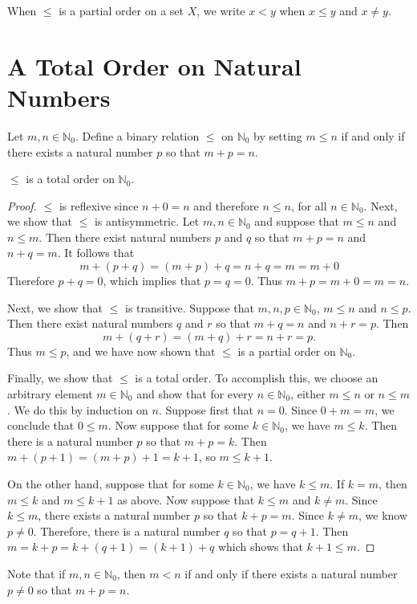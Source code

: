 When $\le$ is a partial order on a set $X$, we write
$x<y$ when $x\le y$ and $x\neq y$.

\section{A Total Order on Natural Numbers}

Let $m,n\in \mathbb{N}_0$. Define a binary relation $\le$ on
$\mathbb{N}_0$ by setting $m\le n$ if and only if
there exists a natural number $p$ so
that $m+p=n$.  

\begin{proposition}
$\le$ is a total order on $\mathbb{N}_0$.
\end{proposition}
\begin{proof}
$\le$ is reflexive since $n+0=n$ and therefore $n\le n$, for all $n\in 
\mathbb{N}_0$.  Next, we show that $\le$ is antisymmetric.  
Let $m,n\in\mathbb{N}_0$ and suppose that $m\le n$ and $n\le m$.  
Then there exist natural numbers $p$ and $q$ so that $m+p=n$ and $n+q=m$.
It follows that
\[
m+(p+q)= (m+p)+q=n+q =m=m+0\]
Therefore $p+q=0$, which implies that $p=q=0$.  Thus $m+p=m+0=m=n$.

Next, we show that $\le$ is transitive.  Suppose that $m,n,p\in
\mathbb{N}_0$, $m\le n$ and $n\le p$.  Then there exist
natural numbers $q$ and $r$ so that $m+q=n$ and $n+r=p$.
Then
\[
m+(q+r)=(m+q)+r=n+r=p.
\]
Thus $m\le p$, and we have now shown that $\le$ is a partial
order on $\mathbb{N}_0$.


Finally, we show that $\le$ is a total order.
To accomplish this, we choose an arbitrary element $m\in\mathbb{N}_0$
and show that for every $n\in\mathbb{N}_0$, either $m\le n$ or
$n\le m$. We do this by induction on $n$.  
Suppose first that $n=0$.  Since $0+m=m$, we conclude that
$0\le m$.
Now suppose that for some $k\in\mathbb{N}_0$, we have
$m\le k$.  Then there is a natural number $p$ so that $m+p=k$.  Then
$m+(p+1) =(m+p)+1=k+1$, so $m\le k+1$.

On the other hand, suppose that for some $k\in\mathbb{N}_0$,
we have $k\le m$.  If $k=m$, then $m\le k$ and
$m\le k+1$ as above.  Now suppose that $k\le m$ and $k\neq m$.
Since $k\le m$, there exists a natural number $p$ so that $k+p=m$.
Since $k\neq m$, we know $p\neq 0$. Therefore, there is a 
natural number $q$ so that
$p=q+1$.  Then $m=k+p=k+(q+1)=(k+1)+q$ which shows that $k+1\le m$.
\end{proof}

Note that if $m,n\in\mathbb{N}_0$, then $m<n$ if and only if
there exists a natural number $p\neq 0$ so that $m+p=n$.

